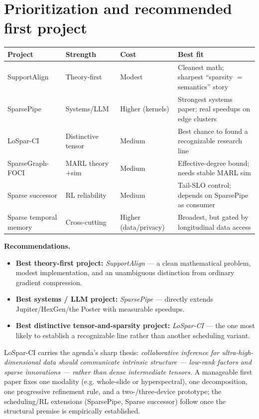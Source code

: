 \documentclass[11pt]{article}
\begin{document}
\section{Prioritization and recommended first project}
\label{sec:prio}

\begin{center}
\renewcommand{\arraystretch}{1.3}
\small
\begin{tabular}{@{}p{3.2cm}p{2.4cm}p{2.2cm}p{5.0cm}@{}}
\toprule
\textbf{Project} & \textbf{Strength} & \textbf{Cost} & \textbf{Best fit} \\
\midrule
SupportAlign & Theory-first & Modest & Cleanest math; sharpest ``sparsity $=$ semantics'' story \\
SparsePipe & Systems/LLM & Higher (kernels) & Strongest systems paper; real speedups on edge clusters \\
LoSpar-CI & Distinctive tensor & Medium & Best chance to found a recognizable research line \\
SparseGraph-FOCI & MARL theory$+$sim & Medium & Effective-degree bound; needs stable MARL sim \\
Sparse successor & RL reliability & Medium & Tail-SLO control; depends on SparsePipe as consumer \\
Sparse temporal memory & Cross-cutting & Higher (data/privacy) & Broadest, but gated by longitudinal data access \\
\bottomrule
\end{tabular}
\end{center}

\noindent\textbf{Recommendations.}
\begin{itemize}[leftmargin=1.5em,nosep]
\item \textbf{Best theory-first project:} \emph{SupportAlign} --- a clean mathematical problem, modest implementation, and an unambiguous distinction from ordinary gradient compression.
\item \textbf{Best systems / LLM project:} \emph{SparsePipe} --- directly extends Jupiter/HexGen/the Poster with measurable speedups.
\item \textbf{Best distinctive tensor-and-sparsity project:} \emph{LoSpar-CI} --- the one most likely to establish a recognizable line rather than another scheduling variant.
\end{itemize}

\begin{claimbox}
LoSpar-CI carries the agenda's sharp thesis: \emph{collaborative inference for
ultra-high-dimensional data should communicate intrinsic structure --- low-rank factors and
sparse innovations --- rather than dense intermediate tensors.} A manageable first paper
fixes one modality (e.g. whole-slide or hyperspectral), one decomposition, one progressive
refinement rule, and a two-/three-device prototype; the scheduling/RL extensions
(SparsePipe, Sparse successor) follow once the structural premise is empirically established.
\end{claimbox}
\end{document}

